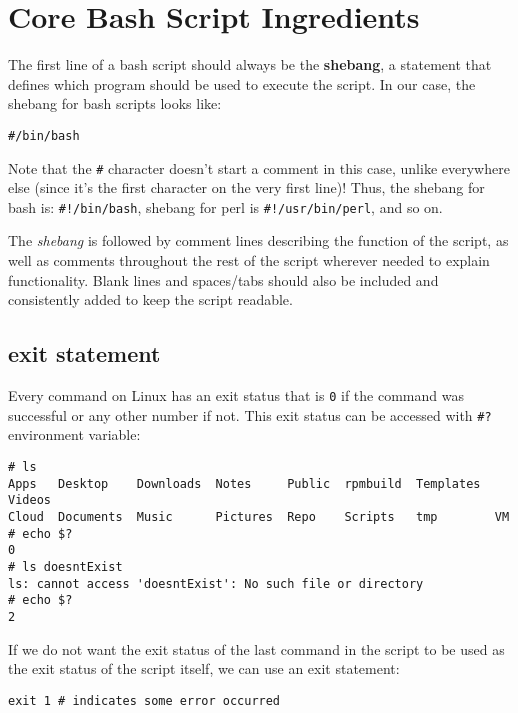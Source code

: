 \section{Core Bash Script Ingredients}
The first line of a bash script should always be the \textbf{shebang}, a statement that defines which program should be used to execute the script. In our case, the shebang for bash scripts looks like:

\vspace{-15pt}
\begin{verbatim}
#/bin/bash
\end{verbatim}
\vspace{-10pt}	

\noindent
Note that the \verb|#| character doesn't start a comment in this case, unlike everywhere else (since it's the first character on the very first line)! Thus, the shebang for bash is: \verb|#!/bin/bash|, shebang for perl is \verb|#!/usr/bin/perl|, and so on. 

The \textit{shebang} is followed by comment lines describing the function of the script, as well as comments throughout the rest of the script wherever needed to explain functionality. Blank lines and spaces/tabs should also be included and consistently added to keep the script readable. 

\subsection{exit statement}
Every command on Linux has an exit status that is \verb|0| if the command was successful or any other number if not. This exit status can be accessed with \verb|#?| environment variable:

\vspace{-15pt}
\begin{verbatim}
# ls
Apps   Desktop    Downloads  Notes     Public  rpmbuild  Templates  Videos
Cloud  Documents  Music      Pictures  Repo    Scripts   tmp        VM
# echo $?
0
# ls doesntExist
ls: cannot access 'doesntExist': No such file or directory
# echo $?
2
\end{verbatim}
\vspace{-10pt}	

\noindent
If we do not want the exit status of the last command in the script to be used as the exit status of the script itself, we can use an exit statement:

\vspace{-15pt}
\begin{verbatim}
exit 1 # indicates some error occurred
\end{verbatim}
\vspace{-10pt}	

